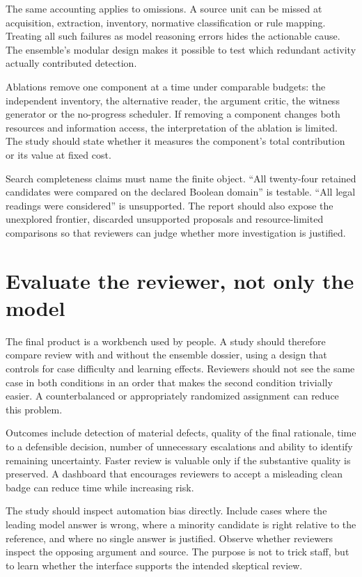
The same accounting applies to omissions. A source unit can be missed at
acquisition, extraction, inventory, normative classification or rule mapping.
Treating all such failures as model reasoning errors hides the actionable cause.
The ensemble's modular design makes it possible to test which redundant activity
actually contributed detection.

Ablations remove one component at a time under comparable budgets: the independent
inventory, the alternative reader, the argument critic, the witness generator or
the no-progress scheduler. If removing a component changes both resources and
information access, the interpretation of the ablation is limited. The study
should state whether it measures the component's total contribution or its value
at fixed cost.

Search completeness claims must name the finite object. ``All twenty-four retained
candidates were compared on the declared Boolean domain'' is testable. ``All legal
readings were considered'' is unsupported. The report should also expose the
unexplored frontier, discarded unsupported proposals and resource-limited
comparisons so that reviewers can judge whether more investigation is justified.

\section{Evaluate the reviewer, not only the model}
\label{merge:M09:11}


The final product is a workbench used by people. A study should therefore compare
review with and without the ensemble dossier, using a design that controls for
case difficulty and learning effects. Reviewers should not see the same case in
both conditions in an order that makes the second condition trivially easier.
A counterbalanced or appropriately randomized assignment can reduce this problem.

Outcomes include detection of material defects, quality of the final rationale,
time to a defensible decision, number of unnecessary escalations and ability to
identify remaining uncertainty. Faster review is valuable only if the substantive
quality is preserved. A dashboard that encourages reviewers to accept a misleading
clean badge can reduce time while increasing risk.


The study should inspect automation bias directly. Include cases where the
leading model answer is wrong, where a minority candidate is right relative to
the reference, and where no single answer is justified. Observe whether reviewers
inspect the opposing argument and source. The purpose is not to trick staff, but
to learn whether the interface supports the intended skeptical review.

